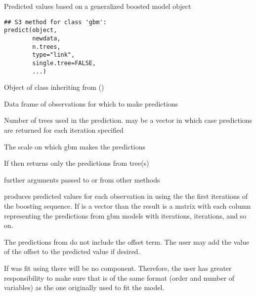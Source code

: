 \begin{Description}\relax
Predicted values based on a generalized boosted model object
\end{Description}
\begin{Usage}
\begin{verbatim}
## S3 method for class 'gbm':
predict(object,
        newdata,
        n.trees,
        type="link",
        single.tree=FALSE,
        ...)
\end{verbatim}
\end{Usage}
\begin{Arguments}
\begin{ldescription}
\item[\code{object}] Object of class inheriting from () 
\item[\code{newdata}] Data frame of observations for which to make predictions 
\item[\code{n.trees}] Number of trees used in the prediction.  may
be a vector in which case predictions are returned for each
iteration specified
\item[\code{type}] The scale on which gbm makes the predictions 
\item[\code{single.tree}] If  then  returns
only the predictions from tree(s) 
\item[\code{...}] further arguments passed to or from other methods 
\end{ldescription}
\end{Arguments}
\begin{Details}\relax
{} produces predicted values for each observation in  using the the first  iterations of the boosting sequence. If  is a vector than the result is a matrix with each column representing the predictions from gbm models with  iterations,  iterations, and so on.

The predictions from  do not include the offset term. The user may add the value of the offset to the predicted value if desired.

If  was fit using  there will be no
 component. Therefore, the user has greater responsibility to make
sure that  is of the same format (order and number of variables)
as the one originally used to fit the model.
\end{Details}
